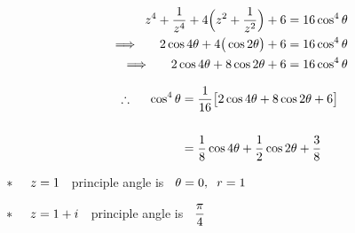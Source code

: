 \documentclass[11pt,a4paper]{article}
\begin{document}
\begin{align*}
z^4 + \dfrac{1}{z^4} + 4 \Big(z^2 + \dfrac{1}{z^2}\Big) + 6 & = 16\cos^4\theta\\
\implies\hspace{0.5cm} 2\cos 4\theta + 4\big(\cos 2\theta\big) + 6 &  = 16\cos^4\theta\\
\implies\hspace{0.5cm} 2\cos 4\theta + 8\cos 2\theta + 6 &  = 16\cos^4\theta
\end{align*}



\begin{align*}
\therefore\hspace{0.5cm} \cos^4\theta & = \dfrac{1}{16}\big[2\cos 4\theta + 8\cos 2\theta + 6 \big]\\\\
& = \dfrac{1}{8}\cos 4\theta + \dfrac{1}{2}\cos 2\theta + \dfrac{3}{8}\\ 
\end{align*}
















$*\hspace{0.5cm} z = 1\hspace{0.2cm}$ principle angle is $\hspace{0.2cm} \theta = 0, \hspace{0.2cm} r = 1$


\begin{figure}[H]
\centering
{}
\end{figure}










$*\hspace{0.5cm} z = 1 + i\hspace{0.2cm}$ principle angle is $\hspace{0.2cm}\dfrac{\pi}{4}\hspace{2cm}$
\end{document}
